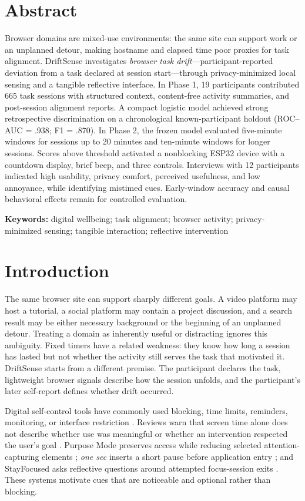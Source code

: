 \documentclass[12pt,a4paper]{article}
\newcommand{\citep}[1]{\parencite{#1}}
\begin{document}
\section*{Abstract}
\noindent Browser domains are mixed-use environments: the same site can support work or an unplanned detour, making hostname and elapsed time poor proxies for task alignment. DriftSense investigates \emph{browser task drift}---participant-reported deviation from a task declared at session start---through privacy-minimized local sensing and a tangible reflective interface. In Phase 1, 19 participants contributed 665 task sessions with structured context, content-free activity summaries, and post-session alignment reports. A compact logistic model achieved strong retrospective discrimination on a chronological known-participant holdout (ROC--AUC = .938; F1 = .870). In Phase 2, the frozen model evaluated five-minute windows for sessions up to 20 minutes and ten-minute windows for longer sessions. Scores above threshold activated a nonblocking ESP32 device with a countdown display, brief beep, and three controls. Interviews with 12 participants indicated high usability, privacy comfort, perceived usefulness, and low annoyance, while identifying mistimed cues. Early-window accuracy and causal behavioral effects remain for controlled evaluation.

\vspace{6pt}
\noindent\textbf{Keywords:} digital wellbeing; task alignment; browser activity; privacy-minimized sensing; tangible interaction; reflective intervention

\section{Introduction}

The same browser site can support sharply different goals. A video platform may host a tutorial, a social platform may contain a project discussion, and a search result may be either necessary background or the beginning of an unplanned detour. Treating a domain as inherently useful or distracting ignores this ambiguity. Fixed timers have a related weakness: they know how long a session has lasted but not whether the activity still serves the task that motivated it. DriftSense starts from a different premise. The participant declares the task, lightweight browser signals describe how the session unfolds, and the participant's later self-report defines whether drift occurred.

Digital self-control tools have commonly used blocking, time limits, reminders, monitoring, or interface restriction \citep{lyngs2019selfcontrol,biedermann2021digital,roffarello2023digital}. Reviews warn that screen time alone does not describe whether use was meaningful or whether an intervention respected the user's goal \citep{almoallim2022functionalities,rahmillah2023apps}. Purpose Mode preserves access while reducing selected attention-capturing elements \citep{lee2025purpose}; \textit{one sec} inserts a short pause before application entry \citep{gruning2023onesec}; and StayFocused asks reflective questions around attempted focus-session exits \citep{li2024stayfocused}. These systems motivate cues that are noticeable and optional rather than blocking.
\end{document}
